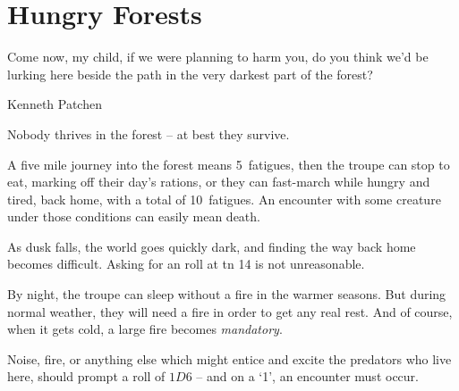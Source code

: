 \chapter{Hungry Forests}
\epigraph{Come now, my child, if we were planning to harm you, do you think we'd be lurking here beside the path in the very darkest part of the forest?}{Kenneth Patchen}

Nobody thrives in the forest -- at best they survive.

A five mile journey into the forest means 5~\glspl{fatigue}, then the troupe can stop to eat, marking off their day's rations, or they can fast-march while hungry and tired, back home, with a total of 10~\glspl{fatigue}.
An encounter with some creature under those conditions can easily mean death.

As dusk falls, the world goes quickly dark, and finding the way back home becomes difficult.
Asking for an  roll at \gls{tn} 14 is not unreasonable.

By night, the troupe can sleep without a fire in the warmer seasons.
But during normal weather, they will need a fire in order to get any real rest.
And of course, when it gets cold, a large fire becomes \emph{mandatory}.

Noise, fire, or anything else which might entice and excite the predators who live here, should prompt a roll of $1D6$ -- and on a `1', an encounter must occur.
